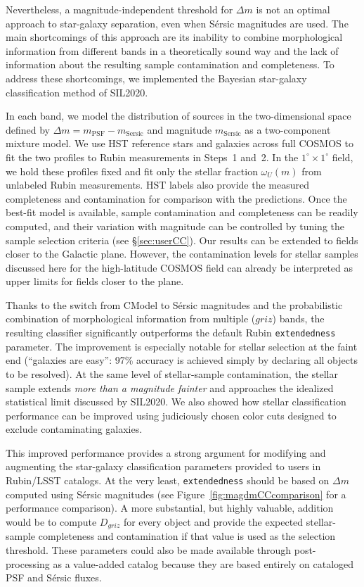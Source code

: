 Nevertheless, a magnitude-independent threshold for $\Delta m$ is not an optimal approach to
star-galaxy separation, even when S\'{e}rsic magnitudes are used. The main shortcomings of this
approach are its inability to combine morphological information from different bands in a
theoretically sound way and the lack of information about the resulting sample contamination and
completeness. To address these shortcomings, we implemented the Bayesian star-galaxy classification
method of SIL2020.


In each band, we model the distribution of sources in the two-dimensional space defined by $\Delta m
= m_{\mathrm{PSF}} - m_{\mathrm{Sersic}}$ and magnitude $m_{\mathrm{Sersic}}$ as a two-component
mixture model. We use HST reference stars and galaxies across full COSMOS to fit the two
profiles to Rubin measurements in Steps~1 and~2. In the \(1^\circ\times1^\circ\) field,
we hold these profiles fixed and fit only the stellar fraction \(\omega_U(m)\) from
unlabeled Rubin measurements. HST labels also provide the measured completeness and
contamination for comparison with the predictions. Once the best-fit model is available, sample contamination and completeness can be readily
computed, and their variation with magnitude can be controlled by tuning the sample selection
criteria (see \S\ref{sec:userCC}). Our results can be extended to fields closer to the Galactic
plane. However, the contamination levels for stellar samples discussed here for the high-latitude COSMOS field can
already be interpreted as upper limits for fields closer to the plane.


Thanks to the switch from CModel to S\'{e}rsic magnitudes and the probabilistic combination of
morphological information from multiple ($griz$) bands, the resulting classifier significantly
outperforms the default Rubin \texttt{extendedness} parameter. The improvement is especially notable
for stellar selection at the faint end (``galaxies are easy'': 97\% accuracy is achieved simply by
declaring all objects to be resolved). At the same level of stellar-sample contamination, the
stellar sample extends {\it more than a magnitude fainter} and approaches the idealized statistical
limit discussed by SIL2020. We also showed how stellar classification performance can be improved
using judiciously chosen color cuts designed to exclude contaminating galaxies.


This improved performance provides a strong argument for modifying and augmenting the star-galaxy
classification parameters provided to users in Rubin/LSST catalogs. At the very least,
\texttt{extendedness} should be based on $\Delta m$ computed using S\'{e}rsic magnitudes (see
Figure~\ref{fig:magdmCCcomparison} for a performance comparison). A more substantial, but highly valuable, addition
would be to compute $D_{griz}$ for every object and provide the expected stellar-sample completeness
and contamination if that value is used as the selection threshold. These parameters
could also be made available through post-processing as a value-added catalog because they are based
entirely on cataloged PSF and S\'{e}rsic fluxes.


